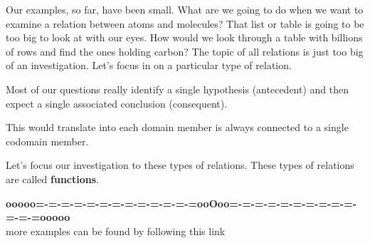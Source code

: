 \documentclass{ximera}
\begin{document}
Our examples, so far, have been small.  What are we going to do when we want to examine a relation between atoms and molecules?  That list or table is going to be too big to look at with our eyes.  How would we look through a table with billions of rows and find the ones holding carbon?  The topic of all relations is just too big of an investigation. Let's focus in on a particular type of relation.

Most of our questions really identify a single hypothesis (antecedent) and then expect a single associated conclusion (consequent).

This would translate into each domain member is always connected to a single codomain member.

Let's focus our investigation to these types of relations.  These types of relations are called \textbf{\textcolor{purple!85!blue}{functions}}.














\begin{center}
\textbf{\textcolor{green!50!black}{ooooo=-=-=-=-=-=-=-=-=-=-=-=-=ooOoo=-=-=-=-=-=-=-=-=-=-=-=-=ooooo}} \\

more examples can be found by following this link\\ 

\end{center}
\end{document}

